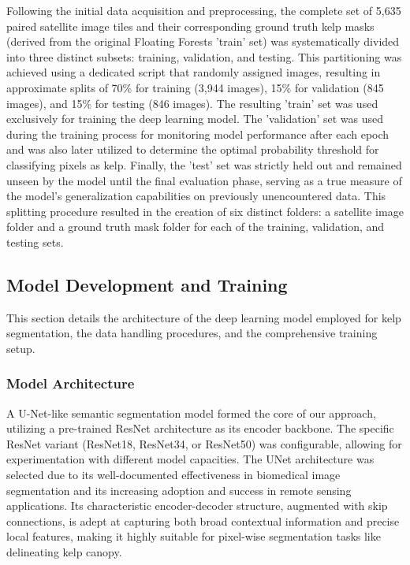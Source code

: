 \documentclass{article}
\begin{document}
Following the initial data acquisition and preprocessing, the complete set of 5,635 paired satellite image tiles and their corresponding ground truth kelp masks (derived from the original Floating Forests 'train' set) was systematically divided into three distinct subsets: training, validation, and testing. This partitioning was achieved using a dedicated script that randomly assigned images, resulting in approximate splits of 70\% for training (3,944 images), 15\% for validation (845 images), and 15\% for testing (846 images). The resulting 'train' set was used exclusively for training the deep learning model. The 'validation' set was used during the training process for monitoring model performance after each epoch and was also later utilized to determine the optimal probability threshold for classifying pixels as kelp. Finally, the 'test' set was strictly held out and remained unseen by the model until the final evaluation phase, serving as a true measure of the model's generalization capabilities on previously unencountered data. This splitting procedure resulted in the creation of six distinct folders: a satellite image folder and a ground truth mask folder for each of the training, validation, and testing sets.

\subsection{Model Development and Training}

This section details the architecture of the deep learning model employed for kelp segmentation, the data handling procedures, and the comprehensive training setup.

\subsubsection{Model Architecture}

A U-Net-like semantic segmentation model formed the core of our approach, utilizing a pre-trained ResNet architecture as its encoder backbone. The specific ResNet variant (ResNet18, ResNet34, or ResNet50) was configurable, allowing for experimentation with different model capacities. The UNet architecture was selected due to its well-documented effectiveness in biomedical image segmentation and its increasing adoption and success in remote sensing applications. Its characteristic encoder-decoder structure, augmented with skip connections, is adept at capturing both broad contextual information and precise local features, making it highly suitable for pixel-wise segmentation tasks like delineating kelp canopy. 
\end{document}
